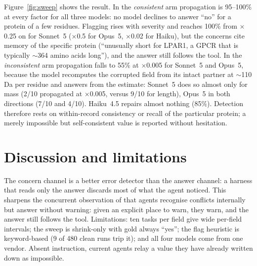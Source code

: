 \documentclass{article}
\begin{document}
Figure~\ref{fig:sweep} shows the result. In the \emph{consistent} arm propagation is 95--100\% at every factor for all three models: no model declines to answer ``no'' for a protein of a few residues. Flagging rises with severity and reaches 100\% from $\times$0.25 on for Sonnet~5 ($\times$0.5 for Opus~5, $\times$0.02 for Haiku), but the concerns cite memory of the specific protein (``unusually short for LPAR1, a GPCR that is typically $\sim$364 amino acids long''), and the answer still follows the tool. In the \emph{inconsistent} arm propagation falls to 55\% at $\times$0.005 for Sonnet~5 and Opus~5, because the model recomputes the corrupted field from its intact partner at $\sim$110\,Da per residue and answers from the estimate: Sonnet~5 does so almost only for mass (2/10 propagated at $\times$0.005, versus 9/10 for length), Opus~5 in both directions (7/10 and 4/10). Haiku~4.5 repairs almost nothing (85\%). Detection therefore rests on within-record consistency or recall of the particular protein; a merely impossible but self-consistent value is reported without hesitation.

\section{Discussion and limitations}
The concern channel is a better error detector than the answer channel: a harness that reads only the answer discards most of what the agent noticed. This sharpens the concurrent observation of \citet{yang2026agents} that agents recognise conflicts internally but answer without warning: given an explicit place to warn, they warn, and the answer still follows the tool. Limitations: ten tasks per field give wide per-field intervals; the sweep is shrink-only with gold always ``yes''; the flag heuristic is keyword-based (9 of 480 clean runs trip it); and all four models come from one vendor. Absent instruction, current agents relay a value they have already written down as impossible.


\setlength{\bibsep}{4pt plus 1pt}


\appendix
\end{document}
